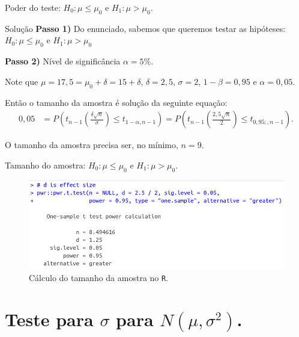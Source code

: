 \documentclass[8pt]{beamer}
\begin{document}
\begin{frame}{Poder do teste: $H_0:\mu \leq \mu_0$ e $H_1: \mu > \mu_0$.}

\begin{block}{Solução}
	\textbf{Passo 1)} Do enunciado, sabemos que queremos testar as hipóteses: $H_0: \mu \leq \mu_0$ e $H_1: \mu > \mu_0$

	\textbf{Passo 2)} Nível de significância $\alpha = 5\%$.

	Note que $\mu=17,5=\mu_0 + \delta = 15 + \delta$, $\delta = 2,5$, $\sigma = 2$, $1-\beta=0,95$ e $\alpha=0,05$.
	
	Então o tamanho da amostra é solução da seguinte equação:
	\begin{align*}
	0,05 &= P \left( t_{n-1}\left( \frac{\delta\sqrt{n}}{\sigma}\right) \leq t_{1-\alpha, n-1}  \right) = P \left( t_{n-1}\left( \frac{2,5\sqrt{n}}{2}\right) \leq t_{0,95;, n-1} \right).
	\end{align*}
\end{block}
O tamanho da amostra precisa ser, no mínimo, $n=9$.
\end{frame}

\begin{frame}{Tamanho do amostra: $H_0:\mu \leq \mu_0$ e $H_1: \mu > \mu_0$.}

\begin{figure}[htbp]
	\centering
	\caption{Cálculo do tamanho da amostra no \texttt{R}.}
	\includegraphics[width=0.9\linewidth]{figures/t-noncentral-sample-size-unilateral-lower-R.png}
\end{figure}

\end{frame}

\section{Teste para $\sigma$ para $N(\mu, \sigma^2)$.}
\end{document}
